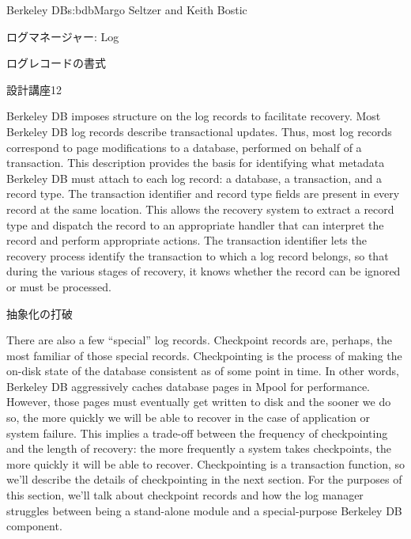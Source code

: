 \begin{aosachapter}{Berkeley DB}{s:bdb}{Margo Seltzer and Keith Bostic}
\begin{aosasect1}{ログマネージャー: Log}
\begin{aosasect2}{ログレコードの書式}
\begin{aosabox}{設計講座12}
\end{aosabox}

Berkeley DB imposes structure on the log records to facilitate
recovery.  Most Berkeley DB log records describe transactional
updates. Thus, most log records correspond to page modifications to a
database, performed on behalf of a transaction. This description
provides the basis for identifying what metadata Berkeley DB must
attach to each log record: a database, a transaction, and a record
type. The transaction identifier and record type fields are present in every
record at the same location.  This allows the recovery system to
extract a record type and dispatch the record to an appropriate
handler that can interpret the record and perform appropriate
actions. The transaction identifier lets the recovery process identify the
transaction to which a log record belongs, so that during the various
stages of recovery, it knows whether the record can be ignored or must
be processed.

\end{aosasect2}

\begin{aosasect2}{抽象化の打破}

There are also a few ``special'' log records.  Checkpoint records are,
perhaps, the most familiar of those special records. Checkpointing is
the process of making the on-disk state of the database consistent as
of some point in time. In other words, Berkeley DB aggressively caches
database pages in Mpool for performance. However, those pages must
eventually get written to disk and the sooner we do so, the more
quickly we will be able to recover in the case of application or
system failure. This implies a trade-off between the frequency of
checkpointing and the length of recovery: the more frequently a system
takes checkpoints, the more quickly it will be able to
recover. Checkpointing is a transaction function, so we'll describe
the details of checkpointing in the next section.  For the purposes of
this section, we'll talk about checkpoint records and how the log
manager struggles between being a stand-alone module and a
special-purpose Berkeley DB component.


\end{aosasect2}
\end{aosasect1}
\end{aosachapter}
